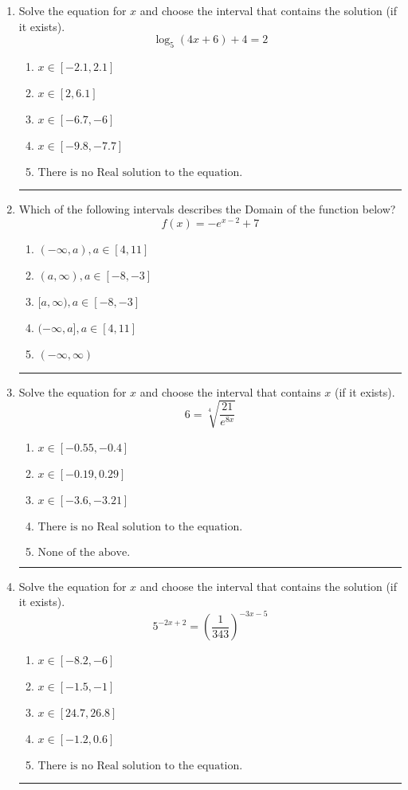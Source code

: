\documentclass[14pt]{extbook}
\newcommand{\litem}[1]{\item#1\hspace*{-1cm}\rule{\textwidth}{0.4pt}}
\begin{document}
\begin{enumerate}
{\begin{enumerate}[label=\Alph*.]
\end{enumerate} }
\litem{
Solve the equation for $x$ and choose the interval that contains the solution (if it exists).\[ \log_{5}{(4x+6)}+4 = 2 \]\begin{enumerate}[label=\Alph*.]
\item \( x \in [-2.1, 2.1] \)
\item \( x \in [2, 6.1] \)
\item \( x \in [-6.7, -6] \)
\item \( x \in [-9.8, -7.7] \)
\item \( \text{There is no Real solution to the equation.} \)

\end{enumerate} }
\litem{
Which of the following intervals describes the Domain of the function below?\[ f(x) = -e^{x-2}+7 \]\begin{enumerate}[label=\Alph*.]
\item \( (-\infty, a), a \in [4, 11] \)
\item \( (a, \infty), a \in [-8, -3] \)
\item \( [a, \infty), a \in [-8, -3] \)
\item \( (-\infty, a], a \in [4, 11] \)
\item \( (-\infty, \infty) \)

\end{enumerate} }
\litem{
 Solve the equation for $x$ and choose the interval that contains $x$ (if it exists).\[  6 = \sqrt[4]{\frac{21}{e^{8x}}} \]\begin{enumerate}[label=\Alph*.]
\item \( x \in [-0.55, -0.4] \)
\item \( x \in [-0.19, 0.29] \)
\item \( x \in [-3.6, -3.21] \)
\item \( \text{There is no Real solution to the equation.} \)
\item \( \text{None of the above.} \)

\end{enumerate} }
\litem{
Solve the equation for $x$ and choose the interval that contains the solution (if it exists).\[ 5^{-2x+2} = \left(\frac{1}{343}\right)^{-3x-5} \]\begin{enumerate}[label=\Alph*.]
\item \( x \in [-8.2, -6] \)
\item \( x \in [-1.5, -1] \)
\item \( x \in [24.7, 26.8] \)
\item \( x \in [-1.2, 0.6] \)
\item \( \text{There is no Real solution to the equation.} \)


\end{enumerate}}
\end{enumerate}
\end{document}
